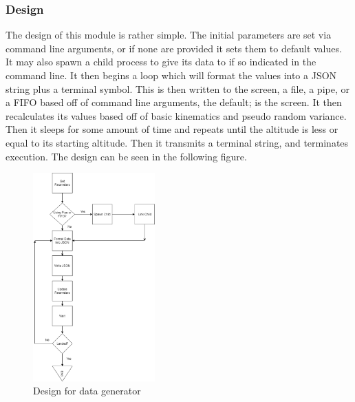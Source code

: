 \documentclass[onecolumn, draftclsnofoot,10pt, compsoc]{IEEEtran}
\begin{document}
\subsubsection{Design}
The design of this module is rather simple. The initial parameters are set via command line arguments, or if none are provided it sets them to default values. It may also spawn a child process to give its data to if so indicated in the command line. It then begins a loop which will format the values into a JSON string plus a terminal symbol. This is then written to the screen, a file, a pipe, or a FIFO based off of command line arguments, the default; is the screen. It then recalculates its values based off of basic kinematics and pseudo random variance. Then it sleeps for some amount of time and repeats until the altitude is less or equal to its starting altitude.  Then it transmits a terminal string, and terminates execution. The design can be seen in the following figure.
\begin{figure}[h]
    \centering
        \includegraphics[height=8cm]{datagen}
        \caption{Design for data generator}
        \label{fig:datagen}
\end{figure}
\end{document}
